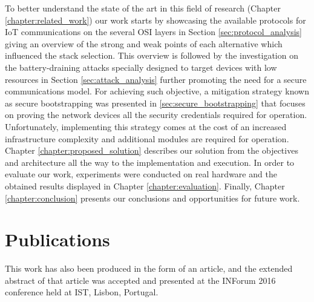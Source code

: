 To better understand the state of the art in this field of research (Chapter \ref{chapter:related_work}) our work starts by showcasing the available protocols for \gls{IoT} communications on the several OSI layers in Section \ref{sec:protocol_analysis} giving an overview of the strong and weak points of each alternative which influenced the stack selection. This overview is followed by the investigation on the battery-draining attacks specially designed to target devices with low resources in Section \ref{sec:attack_analysis} further promoting the need for a secure communications model. For achieving such objective, a mitigation strategy known as secure bootstrapping was presented in \ref{sec:secure_bootstrapping} that focuses on proving the network devices all the security credentials required for operation. Unfortunately, implementing this strategy comes at the cost of an increased infrastructure complexity and additional modules are required for operation. Chapter \ref{chapter:proposed_solution} describes our solution from the objectives and architecture all the way to the implementation and execution. In order to evaluate our work, experiments were conducted on real hardware and the obtained results displayed in Chapter \ref{chapter:evaluation}. Finally, Chapter \ref{chapter:conclusion} presents our conclusions and opportunities for future work. 

\section{Publications} 
	
This work has also been produced in the form of an article, and the extended abstract of that article was accepted and presented at the INForum 2016 conference held at \gls{IST}, Lisbon, Portugal.
